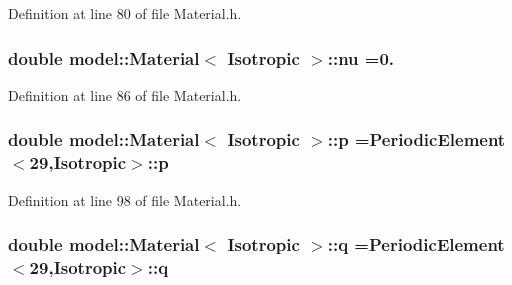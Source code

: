 Definition at line 80 of file Material.\+h.

\hypertarget{classmodel_1_1_material_3_01_isotropic_01_4_af4ba0bae69cdb10d6a198e51c0dd5ee2}{}
\subsubsection[{nu}]{\setlength{\rightskip}{0pt plus 5cm}double {\bf model\+::\+Material}$<$ {\bf Isotropic} $>$\+::nu =0.\hspace{0.3cm}{\ttfamily [static]}}\label{classmodel_1_1_material_3_01_isotropic_01_4_af4ba0bae69cdb10d6a198e51c0dd5ee2}


Definition at line 86 of file Material.\+h.

\hypertarget{classmodel_1_1_material_3_01_isotropic_01_4_a1da96a1b988a82ccc9e82570818f136b}{}
\subsubsection[{p}]{\setlength{\rightskip}{0pt plus 5cm}double {\bf model\+::\+Material}$<$ {\bf Isotropic} $>$\+::p ={\bf Periodic\+Element}$<$29,{\bf Isotropic}$>$\+::p\hspace{0.3cm}{\ttfamily [static]}}\label{classmodel_1_1_material_3_01_isotropic_01_4_a1da96a1b988a82ccc9e82570818f136b}


Definition at line 98 of file Material.\+h.

\hypertarget{classmodel_1_1_material_3_01_isotropic_01_4_af860539daa43d347fcf1ac2624fb1e06}{}
\subsubsection[{q}]{\setlength{\rightskip}{0pt plus 5cm}double {\bf model\+::\+Material}$<$ {\bf Isotropic} $>$\+::q ={\bf Periodic\+Element}$<$29,{\bf Isotropic}$>$\+::q\hspace{0.3cm}{\ttfamily [static]}}\label{classmodel_1_1_material_3_01_isotropic_01_4_af860539daa43d347fcf1ac2624fb1e06}


